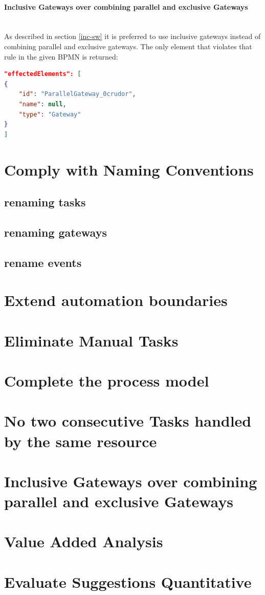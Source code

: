\paragraph{Inclusive Gateways over combining parallel and exclusive Gateways}~\\
As described in section \ref{inc-sw} it is preferred to use inclusive gateways instead of combining parallel and exclusive gateways. The only element that violates that rule in the given BPMN is returned:
\begin{lstlisting}[language=json]
"effectedElements": [
{
	"id": "ParallelGateway_0crudor",
	"name": null,
	"type": "Gateway"
}
]
\end{lstlisting}
\section{Comply with Naming Conventions}
\subsection{renaming tasks}
\subsection{renaming gateways}
\subsection{rename events}

\section{Extend automation boundaries}

\section{Eliminate Manual Tasks}

\section{Complete the process model}

\section{No two consecutive Tasks handled by the same resource}

\section{Inclusive Gateways over combining parallel and exclusive Gateways}

\section{Value Added Analysis}

\section{Evaluate Suggestions Quantitative}

